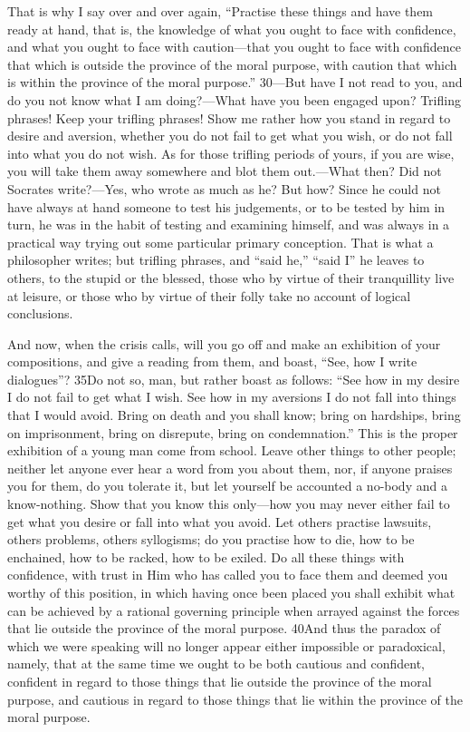 That is why I say over and over again, ``Practise these things and have them ready at hand, that is, the knowledge of what you ought to face with confidence, and what you ought to face with caution—that you ought to face with confidence that which is outside the province of the moral purpose, with caution that which is within the province of the moral purpose.'' 30—But have I not read to you, and do you not know what I am doing?—What have you been engaged upon? Trifling phrases! Keep your trifling phrases! Show me rather how you stand in regard to desire and aversion, whether you do not fail to get what you wish, or do not fall into what you do not wish. As for those trifling periods of yours, if you are wise, you will take them away somewhere and blot them out.—What then? Did not Socrates write?—Yes, who wrote as much as he? But how? Since he could not have always at hand someone to test his judgements, or to be tested by him in turn, he was in the habit of testing and examining himself, and was always in a practical way trying out some particular primary conception. That is what a philosopher writes; but trifling phrases, and ``said he,'' ``said I'' he leaves to others, to the stupid or the blessed, those who by virtue of their tranquillity live at leisure, or those who by virtue of their folly take no account of logical conclusions.

And now, when the crisis calls, will you go off and make an exhibition of your compositions, and give a reading from them, and boast, ``See, how I write dialogues''? 35Do not so, man, but rather boast as follows: ``See how in my desire I do not fail to get what I wish. See how in my aversions I do not fall into things that I would avoid. Bring on death and you shall know; bring on hardships, bring on imprisonment, bring on disrepute, bring on condemnation.'' This is the proper exhibition of a young man come from school. Leave other things to other people; neither let anyone ever hear a word from you about them, nor, if anyone praises you for them, do you tolerate it, but let yourself be accounted a no-body and a know-nothing. Show that you know this only—how you may never either fail to get what you desire or fall into what you avoid. Let others practise lawsuits, others problems, others syllogisms; do you practise how to die, how to be enchained, how to be racked, how to be exiled. Do all these things with confidence, with trust in Him who has called you to face them and deemed you worthy of this position, in which having once been placed you shall exhibit what can be achieved by a rational governing principle when arrayed against the forces that lie outside the province of the moral purpose. 40And thus the paradox of which we were speaking will no longer appear either impossible or paradoxical, namely, that at the same time we ought to be both cautious and confident, confident in regard to those things that lie outside the province of the moral purpose, and cautious in regard to those things that lie within the province of the moral purpose.

